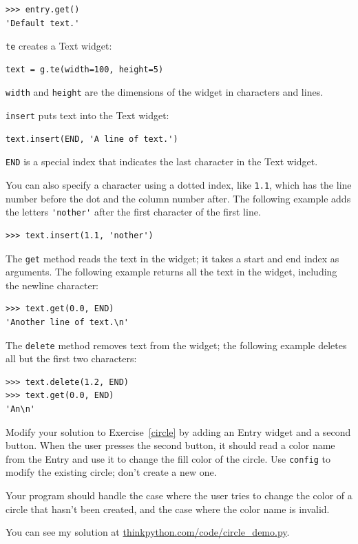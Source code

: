 \documentclass[10pt]{book}
\begin{document}
\beforeverb
\begin{verbatim}
>>> entry.get()
'Default text.'
\end{verbatim}
\afterverb
%
{\tt te} creates a Text widget:

\beforeverb
\begin{verbatim}
text = g.te(width=100, height=5)
\end{verbatim}
\afterverb
%
{\tt width} and {\tt height} are the dimensions of the
widget in characters and lines.

{\tt insert} puts text into the Text widget:

\beforeverb
\begin{verbatim}
text.insert(END, 'A line of text.')
\end{verbatim}
\afterverb
%
{\tt END} is a special index that indicates the last character in the
Text widget.

You can also specify a character using a dotted index, like {\tt 1.1},
which has the line number before the dot and the column number after.
The following example adds the letters \verb"'nother'" after the first
character of the first line.

\beforeverb
\begin{verbatim}
>>> text.insert(1.1, 'nother')
\end{verbatim}
\afterverb
%
The {\tt get} method reads the text in the widget; it takes a start
and end index as arguments.  The following example returns all the
text in the widget, including the newline character:

\beforeverb
\begin{verbatim}
>>> text.get(0.0, END)
'Another line of text.\n'
\end{verbatim}
\afterverb
%
The {\tt delete} method removes text from the widget;
the following example deletes all but the first two characters:

\beforeverb
\begin{verbatim}
>>> text.delete(1.2, END)
>>> text.get(0.0, END)
'An\n'
\end{verbatim}
\afterverb
%

\begin{ex}
\label{circle2}

Modify your solution to Exercise~\ref{circle} by adding an
Entry widget and a second button.  When the user presses the
second button, it should read a color name from the Entry and
use it to change the fill color of the circle.  Use {\tt config}
to modify the existing circle; don't create a new one.

Your program should handle the case where the user tries to
change the color of a circle that hasn't been created, and
the case where the color name is invalid.

You can see my solution at \url{thinkpython.com/code/circle_demo.py}.

\end{ex}
\end{document}
